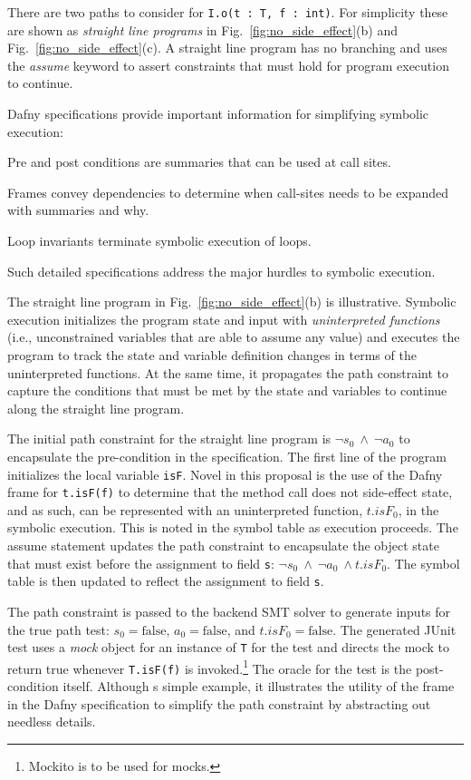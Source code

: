 \documentclass[11pt,onecolumn,notitlepage]{article}
\newcommand{\figref}[1]{Fig.~\ref{#1}}
\begin{document}
There are two paths to consider for \texttt{I.o(t : T, f : int)}. For simplicity these are shown as \emph{straight line programs} in \figref{fig:no_side_effect}(b) and \figref{fig:no_side_effect}(c). A straight line program has no branching and uses the \emph{assume} keyword to assert constraints that must hold for program execution to continue. 

Dafny specifications provide important information for simplifying symbolic execution:
\begin{compactitem}
  \item Pre and post conditions are summaries that can be used at call sites.
  \item Frames convey dependencies to determine when call-sites needs to be expanded with summaries and why.
  \item Loop invariants terminate symbolic execution of loops.
\end{compactitem}
Such detailed specifications address the major hurdles to symbolic execution.

The straight line program in \figref{fig:no_side_effect}(b) is illustrative. Symbolic execution initializes the program state and input with \emph{uninterpreted functions} (i.e., unconstrained variables that are able to assume any value) and executes the program to track the state and variable definition changes in terms of the uninterpreted functions. At the same time, it propagates the path constraint to capture the conditions that must be met by the state and variables to continue along the straight line program.

The initial path constraint for the straight line program is $\neg s_0\ \wedge\ \neg a_0$ to encapsulate the pre-condition in the specification. The first line of the program initializes the local variable \texttt{isF}. Novel in this proposal is the use of the Dafny frame for \texttt{t.isF(f)} to determine that the method call does not side-effect state, and as such, can be represented with an uninterpreted function, $\mathit{t.isF}_0$, in the symbolic execution. This is noted in the symbol table as execution proceeds. The assume statement updates the path constraint to encapsulate the object state that must exist before the assignment to field \texttt{s}: $\neg s_0\ \wedge\ \neg a_0\ \wedge \mathit{t.isF}_0$. The symbol table is then updated to reflect the assignment to field \texttt{s}.

The path constraint is passed to the backend SMT solver to generate inputs for the true path test: $s_0 = \mathrm{false}$, $a_0 = \mathrm{false}$, and $\mathit{t.isF}_0 = \mathrm{false}$. The generated JUnit test uses a \emph{mock} object for an instance of \texttt{T} for the test and directs the mock to return true whenever \texttt{T.isF(f)} is invoked.\footnote{Mockito is to be used for mocks.} The oracle for the test is the post-condition itself. Although s simple example, it illustrates the utility of the frame in the Dafny specification to simplify the path constraint by abstracting out needless details. 
\end{document}
